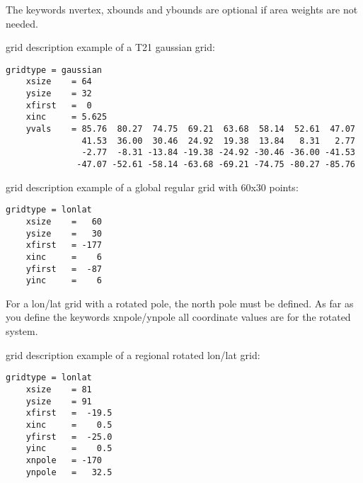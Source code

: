 \vspace{3mm}

The keywords nvertex, xbounds and ybounds are optional if area weights are not needed.

\vspace{2mm}

{\CDO} grid description example of a T21 gaussian grid:
\begin{lstlisting}[frame=single, backgroundcolor=\color{zebg}, basicstyle=\footnotesize]
    gridtype = gaussian
    xsize    = 64
    ysize    = 32
    xfirst   =  0
    xinc     = 5.625
    yvals    = 85.76  80.27  74.75  69.21  63.68  58.14  52.61  47.07
               41.53  36.00  30.46  24.92  19.38  13.84   8.31   2.77
               -2.77  -8.31 -13.84 -19.38 -24.92 -30.46 -36.00 -41.53
              -47.07 -52.61 -58.14 -63.68 -69.21 -74.75 -80.27 -85.76
\end{lstlisting}

\vspace{2mm}

{\CDO} grid description example of a global regular grid with 60x30 points:
\begin{lstlisting}[frame=single, backgroundcolor=\color{zebg}, basicstyle=\footnotesize]
    gridtype = lonlat
    xsize    =   60
    ysize    =   30
    xfirst   = -177
    xinc     =    6
    yfirst   =  -87
    yinc     =    6
\end{lstlisting}

\vspace{2mm}

For a lon/lat grid with a rotated pole, the north pole must be defined.
As far as you define the keywords xnpole/ynpole all coordinate values
are for the rotated system.

\vspace{2mm}

{\CDO} grid description example of a regional rotated lon/lat grid:
\begin{lstlisting}[frame=single, backgroundcolor=\color{zebg}, basicstyle=\footnotesize]
    gridtype = lonlat
    xsize    = 81
    ysize    = 91
    xfirst   =  -19.5
    xinc     =    0.5
    yfirst   =  -25.0
    yinc     =    0.5
    xnpole   = -170
    ynpole   =   32.5
\end{lstlisting}

